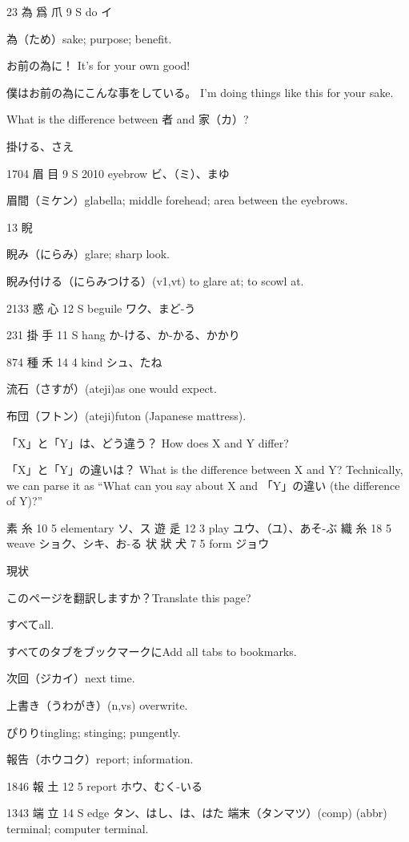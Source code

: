 23	為	爲	爪	9	S		do	イ

為（ため）sake; purpose; benefit.

お前の為に！
It's for your own good!

僕はお前の為にこんな事をしている。
I'm doing things like this for your sake.

What is the difference between 者 and 家（カ）?

掛ける、さえ

1704	眉		目	9	S	2010	eyebrow	ビ、（ミ）、まゆ

眉間（ミケン）glabella; middle forehead; area between the eyebrows.

13 睨

睨み（にらみ）glare; sharp look.

睨み付ける（にらみつける）(v1,vt) to glare at; to scowl at.

2133	惑		心	12	S		beguile	ワク、まど-う

231	掛		手	11	S		hang	か-ける、か-かる、かかり

874	種		禾	14	4		kind	シュ、たね

流石（さすが）(ateji)as one would expect.

布団（フトン）(ateji)futon (Japanese mattress).

「X」と「Y」は、どう違う？
How does X and Y differ?

「X」と「Y」の違いは？
What is the difference between X and Y?
Technically, we can parse it as
``What can you say about X and 「Y」の違い (the difference of Y)?''

素  糸 10 5  elementary ソ、ス
遊  辵 12 3  play ユウ、（ユ）、あそ-ぶ
織  糸 18 5  weave ショク、シキ、お-る
状 狀 犬 7 5  form ジョウ

現状

このページを翻訳しますか？Translate this page?

すべてall.

すべてのタブをブックマークにAdd all tabs to bookmarks.

次回（ジカイ）next time.

上書き（うわがき）(n,vs) overwrite.

ぴりりtingling; stinging; pungently.

報告（ホウコク）report; information.

1846 報  土 12 5  report ホウ、むく-いる

1343 端  立 14 S  edge タン、はし、は、はた
端末（タンマツ）(comp) (abbr) terminal; computer terminal.

